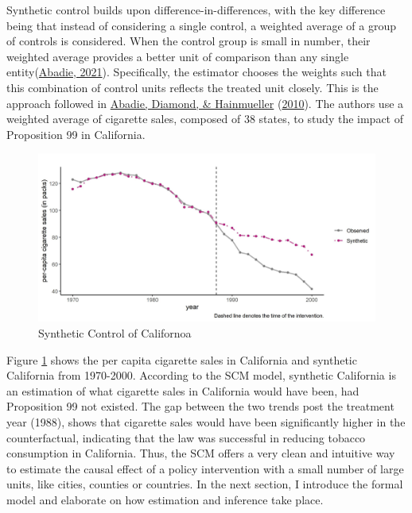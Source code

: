 \documentclass[12pt,nobind, a4paper]{reedthesis}
\begin{document}
 Synthetic control builds upon difference-in-differences, with the key difference being that instead of considering a single control, a weighted average of a group of controls is considered. When the control group is small in number, their weighted average provides a better unit of comparison than any single entity(\protect\hyperlink{ref-abadie_using_2021}{Abadie, 2021}). Specifically, the estimator chooses the weights such that this combination of control units reflects the treated unit closely. This is the approach followed in \protect\hyperlink{ref-abadie_synthetic_2010}{Abadie, Diamond, \& Hainmueller} (\protect\hyperlink{ref-abadie_synthetic_2010}{2010}). The authors use a weighted average of cigarette sales, composed of 38 states, to study the impact of Proposition 99 in California.
 \begin{figure}

 {\centering \includegraphics[width=1\linewidth]{figure/caltrends} 

 }

 \caption{Synthetic Control of Californoa}\label{fig:prop}
 \end{figure}
 Figure \ref{fig:prop} shows the per capita cigarette sales in California and synthetic California from 1970-2000. According to the SCM model, synthetic California is an estimation of what cigarette sales in California would have been, had Proposition 99 not existed. The gap between the two trends post the treatment year (1988), shows that cigarette sales would have been significantly higher in the counterfactual, indicating that the law was successful in reducing tobacco consumption in California. Thus, the SCM offers a very clean and intuitive way to estimate the causal effect of a policy intervention with a small number of large units, like cities, counties or countries. In the next section, I introduce the formal model and elaborate on how estimation and inference take place.
\end{document}
